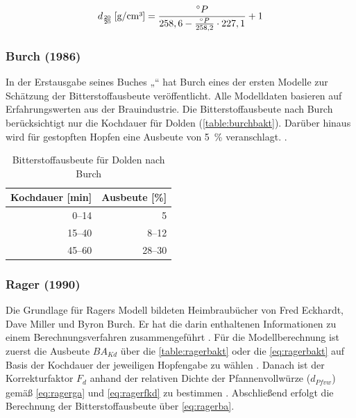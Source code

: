\documentclass[a4paper,parskip=half]{scrartcl}
\newcommand{\BAKt}{{\mathit{BA}}_{\mathit{Kd}}}
\newcommand{\uden}{\:[\text{g/cm³}]}
\newcommand{\FKd}{F_{\mathit{d}}}
\newcommand{\dPfvw}{d_\mathit{Pfvw}}
\begin{document}
\begin{equation}
d_{\frac{20}{20}} \uden = \frac{\degree P}{258,6 - \frac{\degree P}{258,2} \cdot 227,1} + 1
\label{eq:calcptosg}
\end{equation}

\subsubsection*{Burch (1986)}

In der Erstausgabe seines Buches „“ hat Burch eines der ersten Modelle zur Schätzung der Bitterstoffausbeute veröffentlicht. Alle Modelldaten basieren auf Erfahrungswerten aus der Brauindustrie. 
Die Bitterstoffausbeute nach Burch berücksichtigt nur die Kochdauer für Dolden (\autoref{table:burchbakt}). Darüber hinaus wird für gestopften Hopfen eine Ausbeute von 5~\% veranschlagt. \parencite[28-33]{Burch1992}.

\begin{table}[H]
\centering
\begin{tabular}{rr}
\toprule
\multicolumn{1}{c}{\textbf{Kochdauer [min]}} & \multicolumn{1}{c}{\textbf{Ausbeute [\%]}} \\
\midrule
0–14  & 5 \\
15–40 & 8–12 \\
45–60 & 28–30 \\
\bottomrule
\end{tabular}
\caption{Bitterstoffausbeute für Dolden nach Burch \parencite[33]{Burch1992}}
\label{table:burchbakt}
\end{table}

\subsubsection*{Rager (1990)}

Die Grundlage für Ragers Modell bildeten Heimbraubücher von Fred Eckhardt, Dave Miller und Byron Burch. Er hat die darin enthaltenen Informationen zu einem Berechnungsverfahren zusammengeführt \parencite[53]{Rager1990}. 
Für die Modellberechnung ist zuerst die Ausbeute $\BAKt$ über die \autoref{table:ragerbakt} oder die \autoref{eq:ragerbakt} auf Basis der Kochdauer der jeweiligen Hopfengabe zu wählen \parencite{Steinmeyer2021}. Danach ist der Korrekturfaktor $\FKd$ anhand der relativen Dichte der Pfannenvollwürze ($\dPfvw$) gemäß \autoref{eq:ragerga} und \autoref{eq:ragerfkd} zu bestimmen \parencite[53]{Rager1990}. Abschließend erfolgt die Berechnung der Bitterstoffausbeute über \autoref{eq:ragerba}.
\end{document}
